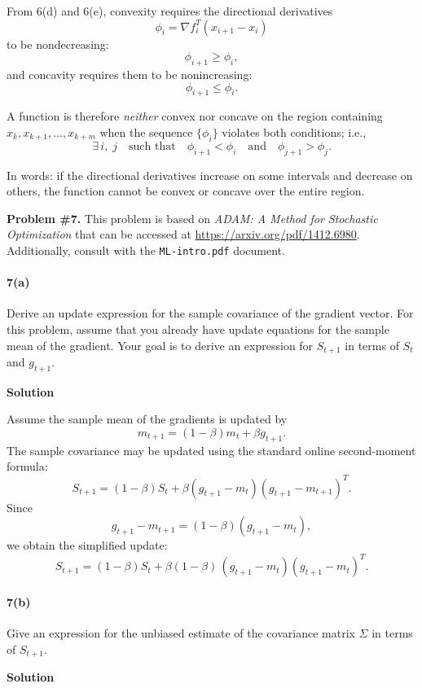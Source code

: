 \documentclass[11pt]{article}
\begin{document}
	From 6(d) and 6(e), convexity requires the directional derivatives
	\[
	\phi_i = \nabla f_i^T (x_{i+1} - x_i)
	\]
	to be nondecreasing:
	\[
	\phi_{i+1} \ge \phi_i,
	\]
	and concavity requires them to be nonincreasing:
	\[
	\phi_{i+1} \le \phi_i.
	\]
	
	A function is therefore \emph{neither} convex nor concave on the region
	containing $x_k, x_{k+1}, \ldots, x_{k+m}$ when the sequence
	$\{\phi_i\}$ violates both conditions; i.e.,
	\[
	\exists\, i,\; j \quad\text{such that}\quad 
	\phi_{i+1} < \phi_i \quad\text{and}\quad \phi_{j+1} > \phi_j.
	\]
	
	In words: if the directional derivatives increase on some intervals and
	decrease on others, the function cannot be convex or concave over the
	entire region.
	
	\newpage
	
	\noindent\textbf{Problem \#7.} This problem is based on \textit{ADAM: A Method for Stochastic Optimization} that can be accessed at \url{https://arxiv.org/pdf/1412.6980}. Additionally, consult with the \texttt{ML-intro.pdf} document.
	
	\paragraph{7(a)} Derive an update expression for the sample covariance of the gradient vector. For this problem, assume that you already have update equations for the sample mean of the gradient. Your goal is to derive an expression for $S_{t+1}$ in terms of $S_t$ and $g_{t+1}$.
	
	\noindent\textbf{Solution}
	
	Assume the sample mean of the gradients is updated by
	\[
	m_{t+1} = (1-\beta)m_t + \beta g_{t+1}.
	\]
	The sample covariance may be updated using the standard online
	second-moment formula:
	\[
	S_{t+1}
	= (1-\beta) S_t
	+ \beta (g_{t+1} - m_t)(g_{t+1} - m_{t+1})^T.
	\]
	Since
	\[
	g_{t+1} - m_{t+1} = (1-\beta)(g_{t+1} - m_t),
	\]
	we obtain the simplified update:
	\[
	S_{t+1}
	= (1-\beta) S_t
	+ \beta(1-\beta)\,(g_{t+1} - m_t)(g_{t+1} - m_t)^T.
	\]
	
	\paragraph{7(b)} Give an expression for the unbiased estimate of the covariance matrix $\Sigma$ in terms of $S_{t+1}$.
	
	\noindent\textbf{Solution}
	
\end{document}
